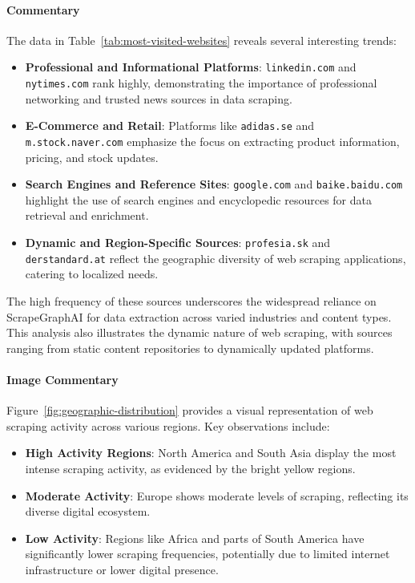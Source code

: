 \paragraph{Commentary}
The data in Table~\ref{tab:most-visited-websites} reveals several interesting trends:
\begin{itemize}
    \item \textbf{Professional and Informational Platforms}: \texttt{linkedin.com} and \texttt{nytimes.com} rank highly, demonstrating the importance of professional networking and trusted news sources in data scraping.
    \item \textbf{E-Commerce and Retail}: Platforms like \texttt{adidas.se} and \texttt{m.stock.naver.com} emphasize the focus on extracting product information, pricing, and stock updates.
    \item \textbf{Search Engines and Reference Sites}: \texttt{google.com} and \texttt{baike.baidu.com} highlight the use of search engines and encyclopedic resources for data retrieval and enrichment.
    \item \textbf{Dynamic and Region-Specific Sources}: \texttt{profesia.sk} and \texttt{derstandard.at} reflect the geographic diversity of web scraping applications, catering to localized needs.
\end{itemize}

The high frequency of these sources underscores the widespread reliance on ScrapeGraphAI for data extraction across varied industries and content types. This analysis also illustrates the dynamic nature of web scraping, with sources ranging from static content repositories to dynamically updated platforms.

\paragraph{Image Commentary}
Figure~\ref{fig:geographic-distribution} provides a visual representation of web scraping activity across various regions. Key observations include:
\begin{itemize}
    \item \textbf{High Activity Regions}: North America and South Asia display the most intense scraping activity, as evidenced by the bright yellow regions.
    \item \textbf{Moderate Activity}: Europe shows moderate levels of scraping, reflecting its diverse digital ecosystem.
    \item \textbf{Low Activity}: Regions like Africa and parts of South America have significantly lower scraping frequencies, potentially due to limited internet infrastructure or lower digital presence.
\end{itemize}


